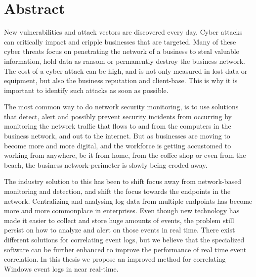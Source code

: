 \chapter*{Abstract}

New vulnerabilities and attack vectors are discovered every day. Cyber attacks can critically impact and cripple businesses that are targeted. Many of these cyber threats focus on penetrating the network of a business to steal valuable information, hold data as ransom or permanently destroy the business network. The cost of a cyber attack can be high, and is not only measured in lost data or equipment, but also the business reputation and client-base. This is why it is important to identify such attacks as soon as possible.

The most common way to do network security monitoring, is to use solutions that detect, alert and possibly prevent security incidents from occurring by monitoring the network traffic that flows to and from the computers in the business network, and out to the internet. But as businesses are moving to become more and more digital, and the workforce is getting accustomed to working from anywhere, be it from home, from the coffee shop or even from the beach, the business network-perimeter is slowly being eroded away.

The industry solution to this has been to shift focus away from network-based monitoring and detection, and shift the focus towards the endpoints in the network. Centralizing and analysing log data from multiple endpoints has become more and more commonplace in enterprises. Even though new technology has made it easier to collect and store huge amounts of events, the problem still persist on how to analyze and alert on those events in real time. There exist different solutions for correlating event logs, but we believe that the specialized software can be further enhanced to improve the performance of real time event correlation. In this thesis we propose an improved method for correlating Windows event logs in near real-time.